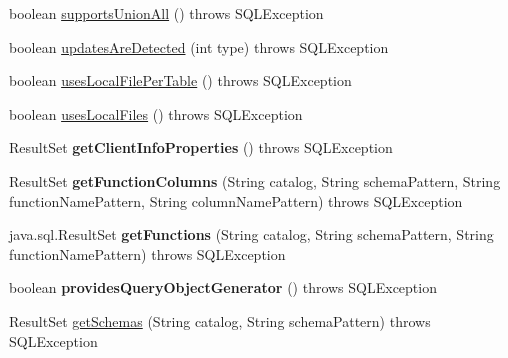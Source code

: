 \begin{DoxyCompactItemize}
boolean \mbox{\hyperlink{classcom_1_1mysql_1_1cj_1_1jdbc_1_1_database_meta_data_a851dcebfa49467db3227e9db24e3f483}{supports\+Union\+All}} ()  throws S\+Q\+L\+Exception 
\item 
boolean \mbox{\hyperlink{classcom_1_1mysql_1_1cj_1_1jdbc_1_1_database_meta_data_a4b81920702dd25181720daaeee3af9f3}{updates\+Are\+Detected}} (int type)  throws S\+Q\+L\+Exception 
\item 
boolean \mbox{\hyperlink{classcom_1_1mysql_1_1cj_1_1jdbc_1_1_database_meta_data_ae6de1bc482f566e7e91fc7ad15b21d7d}{uses\+Local\+File\+Per\+Table}} ()  throws S\+Q\+L\+Exception 
\item 
boolean \mbox{\hyperlink{classcom_1_1mysql_1_1cj_1_1jdbc_1_1_database_meta_data_a99b3d54a7f03294a2c84382e67cc01dc}{uses\+Local\+Files}} ()  throws S\+Q\+L\+Exception 
\item 
\mbox{\label{classcom_1_1mysql_1_1cj_1_1jdbc_1_1_database_meta_data_a00f070467ebedd29c4a8ffaaaee6a99e}} 
Result\+Set {\bfseries get\+Client\+Info\+Properties} ()  throws S\+Q\+L\+Exception 
\item 
\mbox{\label{classcom_1_1mysql_1_1cj_1_1jdbc_1_1_database_meta_data_ad9b7d20a20cd4d7e4c10249d17ce2fda}} 
Result\+Set {\bfseries get\+Function\+Columns} (String catalog, String schema\+Pattern, String function\+Name\+Pattern, String column\+Name\+Pattern)  throws S\+Q\+L\+Exception 
\item 
\mbox{\label{classcom_1_1mysql_1_1cj_1_1jdbc_1_1_database_meta_data_ae354d721f98a4953371b35414a55eaeb}} 
java.\+sql.\+Result\+Set {\bfseries get\+Functions} (String catalog, String schema\+Pattern, String function\+Name\+Pattern)  throws S\+Q\+L\+Exception 
\item 
\mbox{\label{classcom_1_1mysql_1_1cj_1_1jdbc_1_1_database_meta_data_a4f51c3d0f0171ac7e0c4438ed4c3623d}} 
boolean {\bfseries provides\+Query\+Object\+Generator} ()  throws S\+Q\+L\+Exception 
\item 
Result\+Set \mbox{\hyperlink{classcom_1_1mysql_1_1cj_1_1jdbc_1_1_database_meta_data_a87cfe1203d2da7ca4acc7c3ea033118f}{get\+Schemas}} (String catalog, String schema\+Pattern)  throws S\+Q\+L\+Exception 

\end{DoxyCompactItemize}
